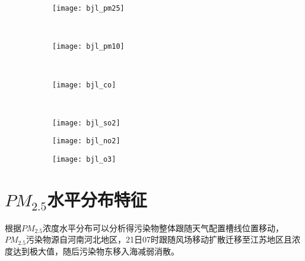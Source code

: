 \begin{figure}[!htbp]
    \centering
    \begin{subfigure}[b]{0.40\textwidth}
      \texttt{[image: bjl\_pm25]}
      \caption{}
      \label{fig:bjl_pm25}
    \end{subfigure}%
    ~%
    \begin{subfigure}[b]{0.40\textwidth}
      \texttt{[image: bjl\_pm10]}
      \caption{}
			\label{fig:bjl_pm10}
    \end{subfigure}
    \\%
    \begin{subfigure}[b]{0.40\textwidth}
      \texttt{[image: bjl\_co]}
      \caption{}
			\label{fig:bjl_co}
    \end{subfigure}%
    ~%
    \begin{subfigure}[b]{0.40\textwidth}
      \texttt{[image: bjl\_so2]}
      \caption{}
			\label{fig:bjl_so2}
    \end{subfigure}
    \begin{subfigure}[b]{0.40\textwidth}
      \texttt{[image: bjl\_no2]}
      \caption{}
			\label{fig:bjl_no2}
    \end{subfigure}
    \begin{subfigure}[b]{0.40\textwidth}
      \texttt{[image: bjl\_o3]}
      \caption{}
			\label{fig:bjl_o3}
    \end{subfigure}
		\label{fig:oaspl}
\end{figure}


\section{$PM_{2.5}$水平分布特征}

根据$PM_{2.5}$浓度水平分布可以分析得污染物整体跟随天气配置槽线位置移动，$PM_{2.5}$污染物源自河南河北地区，21日07时跟随风场移动扩散迁移至江苏地区且浓度达到极大值，随后污染物东移入海减弱消散。

